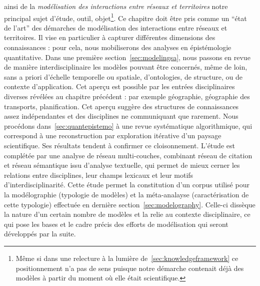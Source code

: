 ainsi de la \emph{modélisation des interactions entre réseaux et territoires} notre principal sujet d'étude, outil, objet\footnote{Même si dans une relecture à la lumière de~\ref{sec:knowledgeframework} ce positionnement n'a pas de sens puisque notre démarche contenait déjà des modèles à partir du moment où elle était scientifique.}. Ce chapitre doit être pris comme un ``état de l'art'' des démarches de modélisation des interactions entre réseaux et territoires. Il vise en particulier à capturer différentes dimensions des connaissances : pour cela, nous mobiliserons des analyses en épistémologie quantitative. Dans une première section~\ref{sec:modelingsa}, nous passons en revue de manière interdisciplinaire les modèles pouvant être concernés, même de loin, sans a priori d'échelle temporelle ou spatiale, d'ontologies, de structure, ou de contexte d'application. Cet aperçu est possible par les entrées disciplinaires diverses révélées au chapitre précédent : par exemple géographie, géographie des transports, planification. Cet aperçu suggère des structures de connaissances assez indépendantes et des disciplines ne communiquant que rarement. Nous procédons dans~\ref{sec:quantepistemo} à une revue systématique algorithmique, qui correspond à une reconstruction par exploration itérative d'un paysage scientifique. Ses résultats tendent à confirmer ce cloisonnement. L'étude est complétée par une analyse de réseau multi-couches, combinant réseau de citation et réseau sémantique issu d'analyse textuelle, qui permet de mieux cerner les relations entre disciplines, leur champs lexicaux et leur motifs d'interdisciplinarité. Cette étude permet la constitution d'un corpus utilisé pour la modélographie (typologie de modèles) et la méta-analayse (caractérisation de cette typologie) effectuée en dernière section~\ref{sec:modelography}. Celle-ci dissèque la nature d'un certain nombre de modèles et la relie au contexte disciplinaire, ce qui pose les bases et le cadre précis des efforts de modélisation qui seront développés par la suite.





